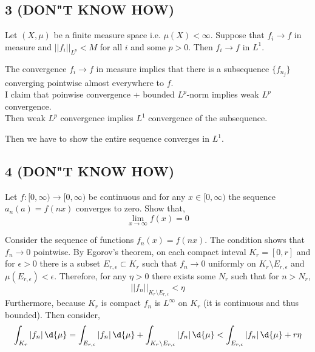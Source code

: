 \documentclass[12pt]{article}
\begin{document}
\subsection{3 (DON"T KNOW HOW)}

\begin{exercise}
Let $(X, \mu)$ be a finite measure space i.e. $\mu(X) < \infty$. Suppose that $f_i \to f$ in measure and $|| f_i ||_{L^p} < M$ for all $i$ and some $p > 0$. Then $f_i \to f$ in $L^1$.
\end{exercise}

The convergence $f_i \to f$ in measure implies that there is a subsequence $\{ f_{n_j} \}$ converging pointwise almost everywhere to $f$. 
\bigskip\\
I claim that poinwise convergence + bounded $L^p$-norm implies weak $L^p$ convergence.
\bigskip\\


 Then weak $L^p$ convergence implies $L^1$ convergence of the subsequence. 

Then we have to show the entire sequence converges in $L^1$.

\subsection{4 (DON"T KNOW HOW)}

\begin{exercise}
Let $f : [0, \infty) \to [0, \infty)$ be continuous and for any $x \in [0, \infty)$ the sequence $a_n(a) = f(n x)$ converges to zero. Show that,
\[ \lim_{x \to \infty} f(x) = 0 \]
\end{exercise}

Consider the sequence of functions $f_n(x) = f(nx)$. The condition shows that $f_n \to 0$ pointwise. By Egorov's theorem, on each compact inteval $K_r = [0,r]$ and for $\epsilon > 0$ there is a subset $E_{r, \epsilon} \subset K_r$ such that $f_n \to 0$ uniformly on $K_r \setminus E_{r,\epsilon}$ and $\mu(E_{r, \epsilon}) < \epsilon$. Therefore, for any $\eta > 0$ there exists some $N_r$ such that for $n > N_r$,
\[ || f_n ||_{K_r \setminus E_{r, \epsilon}} < \eta \]
Furthermore, because $K_r$ is compact $f_n$ is $L^\infty$ on $K_r$ (it is continuous and thus bounded). Then consider,
\[ \int_{K_r} |f_n| \, \d{\mu} = \int_{E_{r, \epsilon}} | f_n | \, \d{\mu} + \int_{K_r \setminus E_{r, \epsilon}} |f_n| \, \d{\mu} < \int_{E_{r, \epsilon}} | f_n | \, \d{\mu} + r \eta \]
\end{document}
